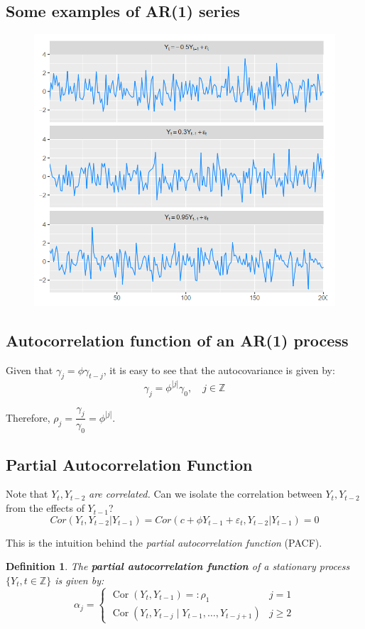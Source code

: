\documentclass[11pt, a4paper]{report}
\theoremstyle{plain}
\theoremstyle{plain}
\newtheorem{defn}{Definition}[section]
\theoremstyle{remark}
\begin{document}
\subsection{Some examples of AR(1) series}

\begin{figure}[h!]
	\centering
	\includegraphics[width=0.6\linewidth]{"ar1"}
	\label{fig:fac-facp}
\end{figure}

\subsection{Autocorrelation function of an AR(1) process}

Given that $\gamma_{j} = \phi \gamma_{t-j}$, it is easy to see that the autocovariance is given by:
$$ \gamma_j = \phi^{|j|} \gamma_0, \hspace{1em} j \in \mathbb{Z} $$

Therefore, $\rho_{j} = \dfrac{\gamma_{j}}{\gamma_{0}} = \phi^{|j|}$.

\subsection{Partial Autocorrelation Function}

Note that $Y_t, Y_{t-2}$ \textit{are correlated.} Can we isolate the correlation between $Y_t, Y_{t-2}$ from the effects of $Y_{t-1}$? 
$$ Cor(Y_t, Y_{t-2} | Y_{t-1}) = Cor(c + \phi Y_{t-1} + \varepsilon_{t}, Y_{t-2} | Y_{t-1}) = 0 $$

This is the intuition behind the \textit{partial autocorrelation function} (PACF). 

\begin{defn}
	The \textbf{partial autocorrelation function} of a stationary process $\{Y_t, t \in \mathbb{Z} \}$ is given by:
$$\alpha_{j}=\left\{\begin{array}{ll}
	\operatorname{Cor}\left(Y_{t}, Y_{t-1}\right)=: \rho_{1} & j=1 \\
	\operatorname{Cor}\left(Y_{t}, Y_{t-j} \mid Y_{t-1}, \ldots, Y_{t-j+1}\right) & j \geq 2
\end{array}\right.$$
\end{defn}
\end{document}
